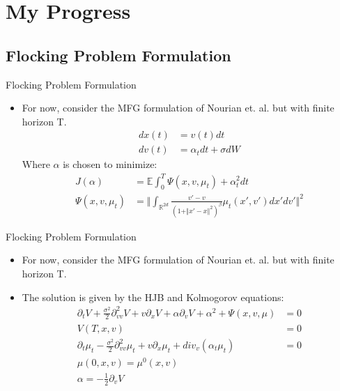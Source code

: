 \documentclass{beamer}
\begin{document}
\section{My Progress}

\subsection{Flocking Problem Formulation}

\begin{frame}{Flocking Problem Formulation}
	\begin{itemize}
		\item {
			For now, consider the MFG formulation of Nourian et. al. but with finite horizon T.
		}
						\begin{equation}
						\begin{split}
						dx(t)&=v(t)dt\\
						dv(t)&=\alpha_tdt+\sigma dW
						\end{split}
						\end{equation}
						Where $\alpha$ is chosen to minimize:
						\begin{equation}
						\begin{split}
						J(\alpha)&=\mathbb{E} \int_0^T \Psi(x,v,\mu_t)+\alpha_t^2 dt \\
						\Psi(x,v,\mu_t)&=\Vert\int_{\mathbb{R}^{2d}}\frac{v'-v}{(1+\Vert x'-x \Vert^2)^\beta}\mu_t(x',v')dx'dv' \Vert^2
						\end{split}
						\end{equation}
	\end{itemize}
\end{frame}

\begin{frame}{Flocking Problem Formulation}
	\begin{itemize}
		\item {
			For now, consider the MFG formulation of Nourian et. al. but with finite horizon T.
		}
		\item {
			The solution is given by the HJB and Kolmogorov equations:
			\begin{equation}
			\begin{split}
			\partial_t V+\frac{\sigma^2}{2}\partial^2_{vv} V+ v \partial_x V+ \alpha \partial_v V+\alpha^2+\Psi(x,v,\mu)&=0 \\
			V(T,x,v)&=0 \\
			\partial_t \mu_t-\frac{\sigma^2}{2}\partial^2_{vv} \mu_t + v \partial_x \mu_t +div_v(\alpha_t \mu_t) &=0 \\
			\mu(0,x,v)=\mu^0(x,v)& \\
			\alpha=-\frac{1}{2}\partial_v V&
			\end{split}
			\end{equation}
		}
	\end{itemize}
\end{frame}
\end{document}
